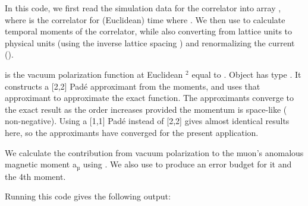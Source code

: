 \documentclass[letterpaper,10pt,english]{sphinxmanual}
\begin{document}
\begin{sphinxVerbatim}[commandchars=\\\{\}]
   
\end{sphinxVerbatim}

In this code, we first read the simulation data for the  correlator into
array , where  is the correlator for (Euclidean) time  
where . We then use {\hyperref[\detokenize{g2tools:g2tools.moments}]{}} to calculate
temporal moments of the correlator, while also converting from lattice units
to physical units (using the inverse lattice spacing )  and
renormalizing the current ().

 is the vacuum polarization function at Euclidean $^{\text{2}}$
equal to . Object  has type {\hyperref[\detokenize{g2tools:g2tools.vacpol}]{}}. It
constructs a  {[}2,2{]} Padé approximant from the moments,
and uses that approximant to  approximate the exact function.
The approximants converge to the exact result as the order
increases provided the momentum is space-like ( non-negative).
Using a {[}1,1{]} Padé instead of {[}2,2{]} gives almost identical results here, so the
approximants have converged for the present application.

We calculate the contribution from vacuum polarization 
to the muon’s anomalous magnetic moment a$_{\text{µ}}$ using
{\hyperref[\detokenize{g2tools:g2tools.a_mu}]{}}. We also use 
to produce an error budget for it and the 4th moment.

Running this code gives the following output:
\end{document}
